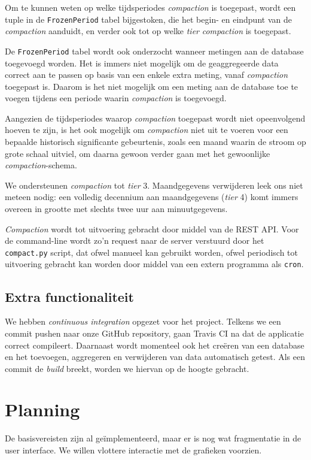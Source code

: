 \documentclass[12pt,draft,parskip=full]{article}
\begin{document}
Om te kunnen weten op welke tijdsperiodes \emph{compaction} is toegepast, wordt een tuple in de \texttt{FrozenPeriod} tabel bijgestoken, die het begin- en eindpunt van de \emph{compaction} aanduidt, en verder ook tot op welke \emph{tier} \emph{compaction} is toegepast. 

De \texttt{FrozenPeriod} tabel wordt ook onderzocht wanneer metingen aan de database toegevoegd worden. Het is immers niet mogelijk om de geaggregeerde data correct aan te passen op basis van een enkele extra meting, vanaf \emph{compaction} toegepast is. Daarom is het niet mogelijk om een meting aan de database toe te voegen tijdens een periode waarin \emph{compaction} is toegevoegd.

Aangezien de tijdsperiodes waarop \emph{compaction} toegepast wordt niet opeenvolgend hoeven te zijn, is het ook mogelijk om \emph{compaction} niet uit te voeren voor een bepaalde historisch significante gebeurtenis, zoals een maand waarin de stroom op grote schaal uitviel, om daarna gewoon verder gaan met het gewoonlijke \emph{compaction}-schema.

We ondersteunen \emph{compaction} tot \emph{tier} 3. Maandgegevens verwijderen leek ons niet meteen nodig: een volledig decennium aan maandgegevens (\emph{tier} 4) komt immers overeen in grootte met slechts twee uur aan minuutgegevens.

\emph{Compaction} wordt tot uitvoering gebracht door middel van de REST API. Voor de command-line wordt zo'n request naar de server verstuurd door het \texttt{compact.py} script, dat ofwel manueel kan gebruikt worden, ofwel periodisch tot uitvoering gebracht kan worden door middel van een extern programma als \texttt{cron}.

\subsection{Extra functionaliteit}

We hebben
\emph{continuous integration} opgezet voor het project. Telkens we een {commit}
pushen naar onze GitHub {repository}, gaan Travis CI na dat de applicatie correct compileert. Daarnaast wordt
momenteel ook het cre\"eren van een database en het toevoegen, aggregeren en verwijderen van data automatisch getest. Als een commit de \textit{build} breekt, worden we hiervan op de hoogte gebracht.

\section{Planning}
De basisvereisten zijn al ge\"implementeerd, maar er is nog wat fragmentatie in
de user interface. We willen vlottere interactie met de grafieken voorzien.
\end{document}
